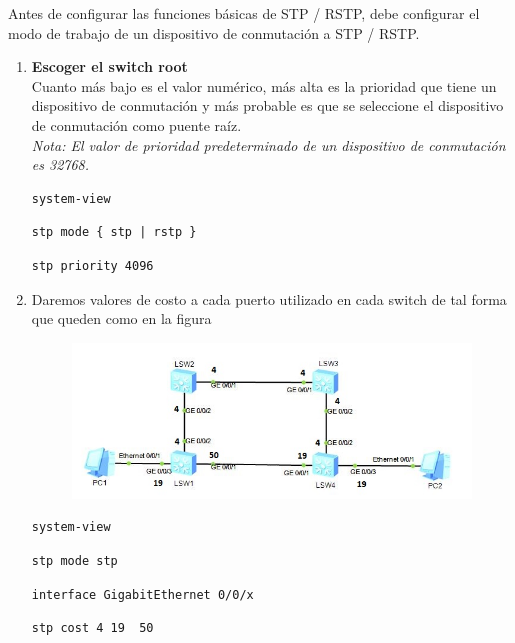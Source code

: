 \documentclass[journal]{IEEEtran}
\begin{document}
Antes de configurar las funciones básicas de STP / RSTP, debe configurar el modo de trabajo de un dispositivo de conmutación a STP / RSTP.

\begin{enumerate}
	\item \textbf{Escoger el switch root}\\
	
	Cuanto más bajo es el valor numérico, más alta es la prioridad que tiene un dispositivo de conmutación y más probable es que se seleccione el dispositivo de conmutación como puente raíz.\\
	
	\textit{Nota: El valor de prioridad predeterminado de un dispositivo de conmutación es 32768.}
	
	\begin{lstlisting}[frame=single]
system-view
		\end{lstlisting}
		\begin{lstlisting}[frame=single]
stp mode { stp | rstp }
		\end{lstlisting}
		
		\begin{lstlisting}[frame=single]
stp priority 4096
		\end{lstlisting}

	\item Daremos valores de costo a cada puerto utilizado en cada switch de tal forma que queden como en la figura
	
	\begin{figure}[ht]
		\centering
		\includegraphics[scale=0.5]{5.jpg}
	\end{figure}

	\begin{lstlisting}[frame=single]
system-view
		\end{lstlisting}
	\begin{lstlisting}[frame=single]
stp mode stp
		\end{lstlisting}
		\begin{lstlisting}[frame=single]
interface GigabitEthernet 0/0/x
		\end{lstlisting}
		\begin{lstlisting}[frame=single]
stp cost 4 19  50
		\end{lstlisting}
		

\end{enumerate}
\end{document}
